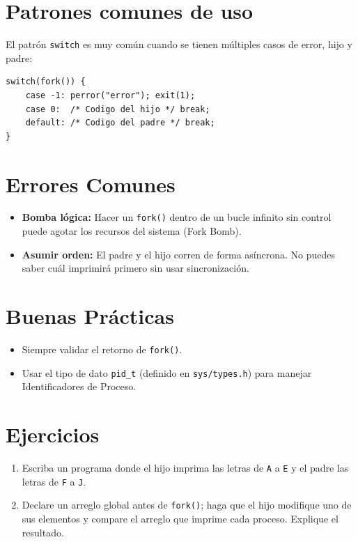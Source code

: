 \documentclass[12pt,a4paper]{article}
\begin{document}
\section{Patrones comunes de uso}
El patrón \texttt{switch} es muy común cuando se tienen múltiples casos de error, hijo y padre:
\begin{lstlisting}
switch(fork()) {
    case -1: perror("error"); exit(1);
    case 0:  /* Codigo del hijo */ break;
    default: /* Codigo del padre */ break;
}
\end{lstlisting}

\section{Errores Comunes}
\begin{itemize}
    \item \textbf{Bomba lógica:} Hacer un \texttt{fork()} dentro de un bucle infinito sin control puede agotar los recursos del sistema (Fork Bomb).
    \item \textbf{Asumir orden:} El padre y el hijo corren de forma asíncrona. No puedes saber cuál imprimirá primero sin usar sincronización.
\end{itemize}

\section{Buenas Prácticas}
\begin{itemize}
    \item Siempre validar el retorno de \texttt{fork()}.
    \item Usar el tipo de dato \texttt{pid\_t} (definido en \texttt{sys/types.h}) para manejar Identificadores de Proceso.
\end{itemize}

\section{Ejercicios}
\begin{enumerate}
    \item Escriba un programa donde el hijo imprima las letras de \texttt{A} a \texttt{E} y el padre las letras de \texttt{F} a \texttt{J}.
    \item Declare un arreglo global antes de \texttt{fork()}; haga que el hijo modifique uno de sus elementos y compare el arreglo que imprime cada proceso. Explique el resultado.
\end{enumerate}
\end{document}
